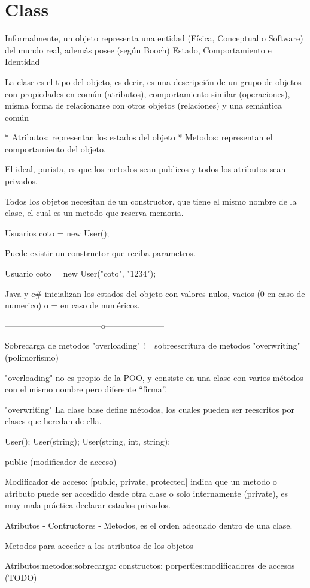 \section{Class}

Informalmente, un objeto representa una entidad (Física, Conceptual o Software) del mundo real, además posee (según Booch) Estado, Comportamiento e Identidad

La clase es el tipo del objeto, es decir, es una descripción de un grupo de objetos con propiedades en común (atributos), comportamiento similar (operaciones), misma forma de relacionarse con otros objetos (relaciones) y una semántica común 

* Atributos: representan los estados del objeto
* Metodos: representan el comportamiento del objeto.

El ideal, purista, es que los metodos sean publicos y todos los atributos sean privados.

Todos los objetos necesitan de un constructor, que tiene el mismo nombre de la clase, el cual es un metodo que reserva memoria. 

Usuarios coto = new User();

Puede existir un constructor que reciba parametros.

Usuario coto = new User("coto", "1234");

Java y c\# inicializan los estados del objeto con valores nulos, vacios (0 en caso de numerico) o = en caso de numéricos.

-----------------------------------o---------------------

Sobrecarga de metodos "overloading" != sobreescritura de metodos "overwriting" (polimorfismo)

"overloading" no es propio de la POO, y consiste en una clase con varios métodos con el mismo nombre pero diferente “firma”.

"overwriting" La clase base define métodos, los cuales pueden ser reescritos por clases que heredan de ella. 

User();
User(string);
User(string, int, string);

public (modificador de acceso) -

Modificador de acceso: [public, private, protected] indica que un metodo o atributo puede ser accedido desde otra clase o solo internamente (private), es muy mala práctica declarar estados privados.

Atributos - Contructores - Metodos, es el orden adecuado dentro de una clase.


Metodos para acceder a los atributos de los objetos


Atributos:metodos:sobrecarga: constructos: porperties:modificadores de accesos (TODO)


